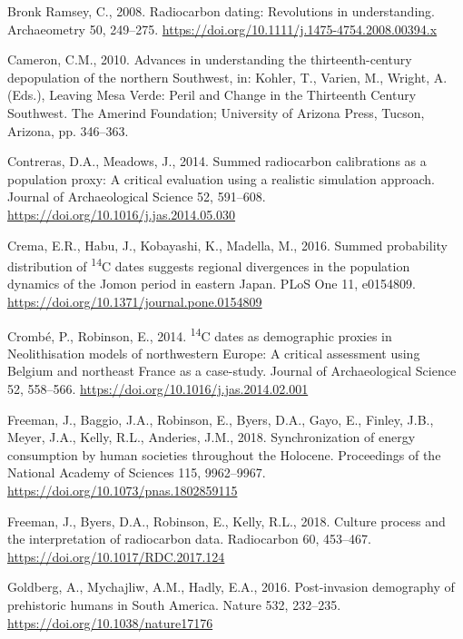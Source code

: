 \documentclass[
]{article}
\newlength{\cslhangindent}
\newenvironment{cslreferences}%
  {\setlength{\parindent}{0pt}%
  \everypar{\setlength{\hangindent}{\cslhangindent}}\ignorespaces}%
  {\par}
\begin{document}
\begin{cslreferences}
\leavevmode\hypertarget{ref-Bronk2008}{}%
Bronk Ramsey, C., 2008. Radiocarbon dating: Revolutions in understanding. Archaeometry 50, 249--275. \url{https://doi.org/10.1111/j.1475-4754.2008.00394.x}

\leavevmode\hypertarget{ref-Cameron2010}{}%
Cameron, C.M., 2010. Advances in understanding the thirteenth-century depopulation of the northern Southwest, in: Kohler, T., Varien, M., Wright, A. (Eds.), Leaving Mesa Verde: Peril and Change in the Thirteenth Century Southwest. The Amerind Foundation; University of Arizona Press, Tucson, Arizona, pp. 346--363.

\leavevmode\hypertarget{ref-Contreras2014}{}%
Contreras, D.A., Meadows, J., 2014. Summed radiocarbon calibrations as a population proxy: A critical evaluation using a realistic simulation approach. Journal of Archaeological Science 52, 591--608. \url{https://doi.org/10.1016/j.jas.2014.05.030}

\leavevmode\hypertarget{ref-Crema2016}{}%
Crema, E.R., Habu, J., Kobayashi, K., Madella, M., 2016. Summed probability distribution of \textsuperscript{14}C dates suggests regional divergences in the population dynamics of the Jomon period in eastern Japan. PLoS One 11, e0154809. \url{https://doi.org/10.1371/journal.pone.0154809}

\leavevmode\hypertarget{ref-Crombe2014}{}%
Crombé, P., Robinson, E., 2014. \textsuperscript{14}C dates as demographic proxies in Neolithisation models of northwestern Europe: A critical assessment using Belgium and northeast France as a case-study. Journal of Archaeological Science 52, 558--566. \url{https://doi.org/10.1016/j.jas.2014.02.001}

\leavevmode\hypertarget{ref-Freeman2018PNAS}{}%
Freeman, J., Baggio, J.A., Robinson, E., Byers, D.A., Gayo, E., Finley, J.B., Meyer, J.A., Kelly, R.L., Anderies, J.M., 2018. Synchronization of energy consumption by human societies throughout the Holocene. Proceedings of the National Academy of Sciences 115, 9962--9967. \url{https://doi.org/10.1073/pnas.1802859115}

\leavevmode\hypertarget{ref-Freeman2018}{}%
Freeman, J., Byers, D.A., Robinson, E., Kelly, R.L., 2018. Culture process and the interpretation of radiocarbon data. Radiocarbon 60, 453--467. \url{https://doi.org/10.1017/RDC.2017.124}

\leavevmode\hypertarget{ref-Goldberg2016}{}%
Goldberg, A., Mychajliw, A.M., Hadly, E.A., 2016. Post-invasion demography of prehistoric humans in South America. Nature 532, 232--235. \url{https://doi.org/10.1038/nature17176}


\end{cslreferences}
\end{document}
